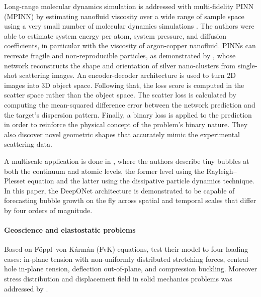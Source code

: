 \documentclass[pdflatex,sn-basic]{sn-jnl}%
\theoremstyle{thmstyleone}%
\theoremstyle{thmstyletwo}%
\theoremstyle{thmstylethree}%
\begin{document}
Long-range molecular dynamics simulation is addressed with multi-fidelity PINN (MPINN) by estimating nanofluid viscosity over a wide range of sample space using a very small number of  molecular dynamics simulations \cite{Isl2021_ExtractionMaterialProperties_ThaITMH}.
The authors were able to estimate system energy per atom, system pressure, and diffusion coefficients, in particular with the viscosity of argon-copper nanofluid.
%
PINNs can recreate fragile and non-reproducible particles, as demonstrated by \cite{Sti2021_ReconstructionNanoscaleParticles_SchSS}, whose network reconstructs the shape and orientation of silver nano-clusters from single-shot scattering images. 
An encoder-decoder architecture is used to turn 2D images into 3D object space. Following that, the loss score is computed in the scatter space rather than the object space.
The scatter loss is calculated by computing the mean-squared difference error between the network prediction and the target's dispersion pattern.
Finally, a binary loss is applied to the prediction in order to reinforce the physical concept of the problem's binary nature. 
They also discover novel geometric shapes that accurately mimic the experimental scattering data.

A multiscale application is done in \cite{Lin2021_OperatorLearningPredicting_LiLLL, Lin2021_SeamlessMultiscaleOperator_MaxLMLK},
where the authors describe tiny bubbles at both the continuum and atomic levels, the former level using the Rayleigh–Plesset equation and the latter using the dissipative particle dynamics technique.
In this paper, the DeepONet architecture \citep{Lu2021_LearningNonlinearOperators_JinLJP} is demonstrated to be capable of forecasting bubble growth on the fly across spatial and temporal scales that differ by four orders of magnitude. 




\paragraph{Geoscience and elastostatic problems}

Based on Föppl–von Kármán (FvK) equations, \cite{Li2021_PhysicsGuidedNeural_BazLBZ}
test their model to four loading cases: in-plane tension with non-uniformly distributed stretching forces, central-hole in-plane tension, deflection out-of-plane, and compression buckling.
Moreover stress distribution and displacement field in solid mechanics problems was addressed by
\cite{Hag2021_SciannKerastensorflowWrapper_JuaHJ}. %
\end{document}
